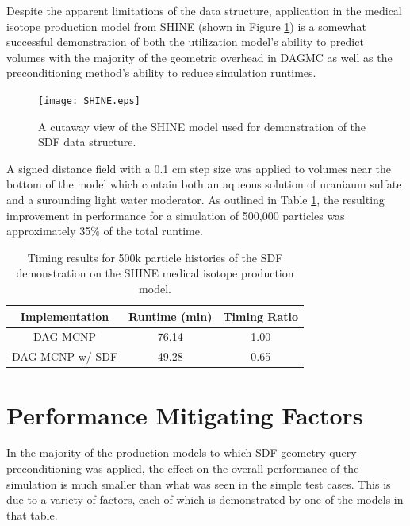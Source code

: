
Despite the apparent limitations of the data structure, application in the
medical isotope production model from SHINE (shown in Figure
\ref{fig:shine_sdf}) is a somewhat successful demonstration of both the
utilization model's ability to predict volumes with the majority of the
geometric overhead in DAGMC as well as the preconditioning method's ability to
reduce simulation runtimes.

\begin{figure}
\centering
\texttt{[image: SHINE.eps]}
\caption{A cutaway view of the SHINE model used for demonstration of the SDF
  data structure.}
\label{fig:shine_sdf}
\end{figure}

A signed distance field with a 0.1 cm step size was applied to volumes near the
bottom of the model which contain both an aqueous solution of uraniaum sulfate
and a surounding light water moderator. As outlined in Table
\ref{tab:shine_sdf_result}, the resulting improvement in performance for a
simulation of 500,000 particles was approximately 35\% of the total runtime.

\begin{table}[H]
\centering
\begin{tabular}{c c c}
  \toprule
  \textbf{Implementation} & \textbf{Runtime (min)} & \textbf{Timing Ratio} \\
  \hline
  DAG-MCNP                & 76.14                  & 1.00                  \\
  DAG-MCNP w/ SDF         & 49.28                  & 0.65                  \\
  \bottomrule
\end{tabular}
\caption{Timing results for 500k particle histories of the SDF demonstration on
  the SHINE medical isotope production model.}
\label{tab:shine_sdf_result}
\end{table}

\section{Performance Mitigating Factors}\label{sec:sdf_limitations}

In the majority of the production models to which SDF geometry query
preconditioning was applied, the effect on the overall performance of the
simulation is much smaller than what was seen in the simple test cases. This is
due to a variety of factors, each of which is demonstrated by one of the models
in that table.


